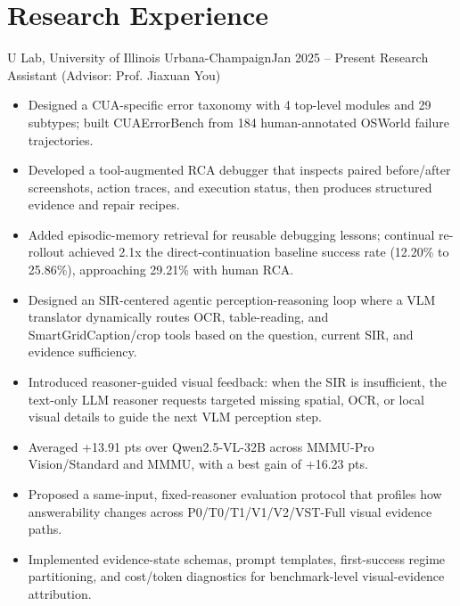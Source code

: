 \section{Research Experience}
\resumeSubHeadingListStart
    \resumeSubheading
      {U Lab, University of Illinois Urbana-Champaign}{Jan 2025 -- Present}
      {Research Assistant (Advisor: Prof. Jiaxuan You)}{}
      \resumeItemListStart
          \begin{itemize}
            \item Designed a CUA-specific error taxonomy with 4 top-level modules and 29 subtypes; built CUAErrorBench from 184 human-annotated OSWorld failure trajectories.
            \item Developed a tool-augmented RCA debugger that inspects paired before/after screenshots, action traces, and execution status, then produces structured evidence and repair recipes.
            \item Added episodic-memory retrieval for reusable debugging lessons; continual re-rollout achieved 2.1x the direct-continuation baseline success rate (12.20\% to 25.86\%), approaching 29.21\% with human RCA.
          \end{itemize}

          \begin{itemize}
            \item Designed an SIR-centered agentic perception-reasoning loop where a VLM translator dynamically routes OCR, table-reading, and SmartGridCaption/crop tools based on the question, current SIR, and evidence sufficiency.
            \item Introduced reasoner-guided visual feedback: when the SIR is insufficient, the text-only LLM reasoner requests targeted missing spatial, OCR, or local visual details to guide the next VLM perception step.
            \item Averaged +13.91 pts over Qwen2.5-VL-32B across MMMU-Pro Vision/Standard and MMMU, with a best gain of +16.23 pts.
          \end{itemize}

          \begin{itemize}
            \item Proposed a same-input, fixed-reasoner evaluation protocol that profiles how answerability changes across P0/T0/T1/V1/V2/VST-Full visual evidence paths.
            \item Implemented evidence-state schemas, prompt templates, first-success regime partitioning, and cost/token diagnostics for benchmark-level visual-evidence attribution.
          \end{itemize}

